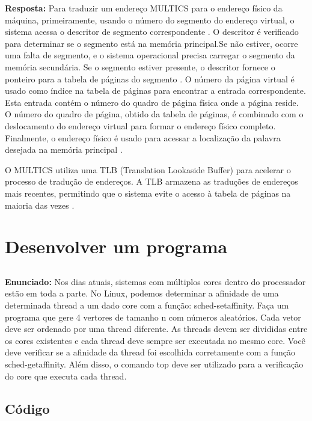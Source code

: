 \documentclass{article}
\begin{document}
\textbf{Resposta:} Para traduzir um endereço MULTICS para o endereço físico da máquina, primeiramente, usando o número do segmento do endereço virtual, o sistema acessa o descritor de segmento correspondente \textcite[p. 169]{tanenbaum2021}. O descritor é verificado para determinar se o segmento está na memória principal.Se não estiver, ocorre uma falta de segmento, e o sistema operacional precisa carregar o segmento da memória secundária. Se o segmento estiver presente, o descritor fornece o ponteiro para a tabela de páginas do segmento \textcite[p. 170]{tanenbaum2021}. O número da página virtual é usado como índice na tabela de páginas para encontrar a entrada correspondente. Esta entrada contém o número do quadro de página física onde a página reside.  O número do quadro de página, obtido da tabela de páginas, é combinado com o deslocamento do endereço virtual para formar o endereço físico completo. Finalmente, o endereço físico é usado para acessar a localização da palavra desejada na memória principal \textcite[p. 171]{tanenbaum2021}.

O MULTICS utiliza uma TLB (Translation Lookaside Buffer) para acelerar o processo de tradução de endereços. A TLB armazena as traduções de endereços mais recentes, permitindo que o sistema evite o acesso à tabela de páginas na maioria das vezes \textcite[p. 172]{tanenbaum2021}.


\section{Desenvolver um programa}

\subsection{}
\textbf{Enunciado:} Nos dias atuais, sistemas com múltiplos cores dentro do processador estão em toda a parte. No Linux, podemos determinar a afinidade de uma determinada thread a um dado core com a função: sched-setaffinity. Faça um programa que gere 4 vertores de tamanho n com números aleatórios. Cada vetor deve ser ordenado por uma thread diferente. As threads devem ser divididas entre os cores existentes e cada thread deve sempre ser executada no mesmo core. Você deve verificar se a afinidade da thread foi escolhida corretamente com a função sched-getaffinity. Além disso, o comando top deve ser utilizado para a verificação do core que executa cada thread. \newline

\subsection{Código}
\label{sub-sec-cod}
%
\end{document}
